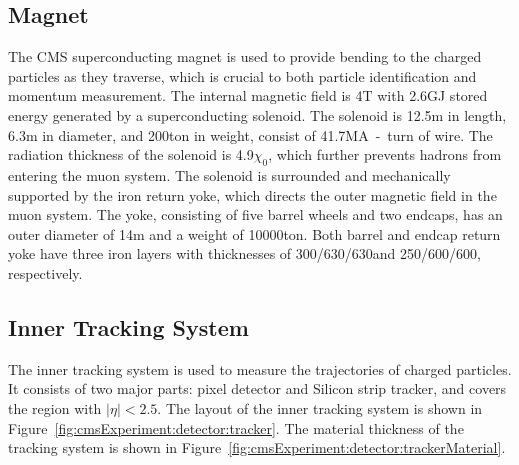 


\subsection{Magnet}
\label{sec:cmsExperiment:detector:magnet}

The CMS superconducting magnet \cite{cms:magnetTdr:Acquistapace:1997fm} is used to provide bending to the charged particles as they traverse, which is crucial to both particle identification and momentum measurement. The internal magnetic field is 4\unit{T} with 2.6\unit{GJ} stored energy generated by a superconducting solenoid. The solenoid is 12.5\unit{m} in length, 6.3\unit{m} in diameter, and 200\unit{ton} in weight, consist of 41.7\unit{MA-turn} of wire. The radiation thickness of the solenoid is 4.9$\chi_0$, which further prevents hadrons from entering the muon system. The solenoid is surrounded and mechanically supported by the iron return yoke, which directs the outer magnetic field in the muon system. The yoke, consisting of five barrel wheels and two endcaps, has an outer diameter of 14\unit{m} and a weight of 10000\unit{ton}. Both barrel and endcap return yoke have three iron layers with thicknesses of 300/630/630\mm and 250/600/600\mm, respectively.


\subsection{Inner Tracking System}
\label{sec:cmsExperiment:detector:tricker}
The inner tracking system \cite{cms:trackerTdr:CMS:1997tlf} is used to measure the trajectories of charged particles. It consists of two major parts: pixel detector and Silicon strip tracker, and covers the region with $|\eta|<2.5$. The layout of the inner tracking system is shown in Figure~\ref{fig:cmsExperiment:detector:tracker}.  The material thickness of the tracking system is shown in Figure~\ref{fig:cmsExperiment:detector:trackerMaterial}.


